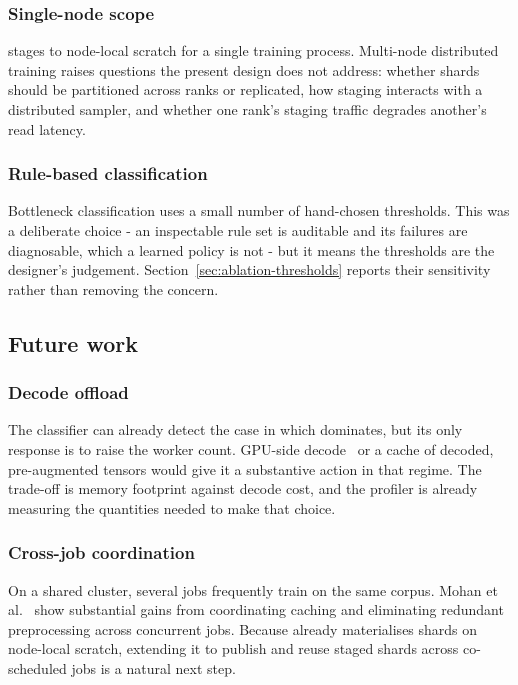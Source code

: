 \subsubsection{Single-node scope}
\pads{} stages to node-local scratch for a single training process.
Multi-node distributed training raises questions the present design does not
address: whether shards should be partitioned across ranks or replicated, how
staging interacts with a distributed sampler, and whether one rank's staging
traffic degrades another's read latency.

\subsubsection{Rule-based classification}
Bottleneck classification uses a small number of hand-chosen thresholds.
This was a deliberate choice - an inspectable rule set is auditable and its
failures are diagnosable, which a learned policy is not - but it means the
thresholds are the designer's judgement.
Section~\ref{sec:ablation-thresholds} reports their sensitivity rather than removing
the concern.

\subsection{Future work}

\subsubsection{Decode offload}
The classifier can already detect the case in which \Tdecode{} dominates, but its
only response is to raise the worker count.
GPU-side decode~\cite{DALI} or a cache of decoded, pre-augmented tensors would give
it a substantive action in that regime.
The trade-off is memory footprint against decode cost, and the profiler is already
measuring the quantities needed to make that choice.

\subsubsection{Cross-job coordination}
On a shared cluster, several jobs frequently train on the same corpus.
Mohan et al.~\cite{Mohan21} show substantial gains from coordinating caching and
eliminating redundant preprocessing across concurrent jobs.
Because \pads{} already materialises shards on node-local scratch, extending it to
publish and reuse staged shards across co-scheduled jobs is a natural next step.

